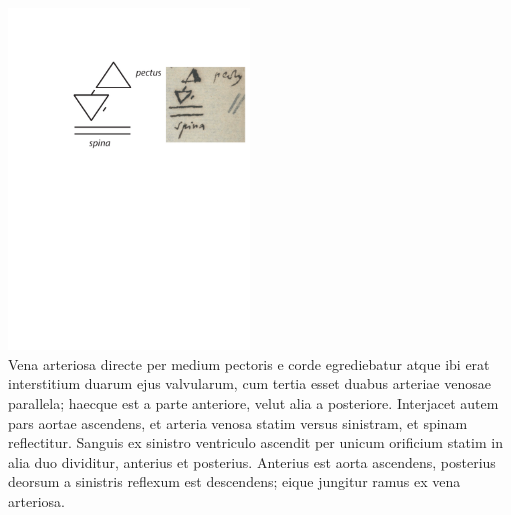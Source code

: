 \pstart
\centering
\includegraphics[trim = 0mm -3mm 0mm 0mm, clip, width=0.48\textwidth]{images/lh0040104b_011r1.pdf}\\
\pend
\vspace{1em}
\pstart
%
Vena arteriosa directe per medium pectoris e corde egrediebatur atque ibi erat interstitium duarum ejus valvularum, cum tertia esset duabus arteriae venosae parallela; haecque est a parte anteriore, velut alia a posteriore.
Inter\-jacet autem pars aortae ascendens, et arteria venosa statim versus sinistram, et spinam reflectitur.
\pend
\pstart
Sanguis ex sinistro ventriculo ascendit per unicum orificium
statim in alia duo dividitur, anterius et posterius. Anterius est aorta ascendens, posterius deorsum a sinistris reflexum est descendens; eique jungitur ramus ex vena arteriosa.
